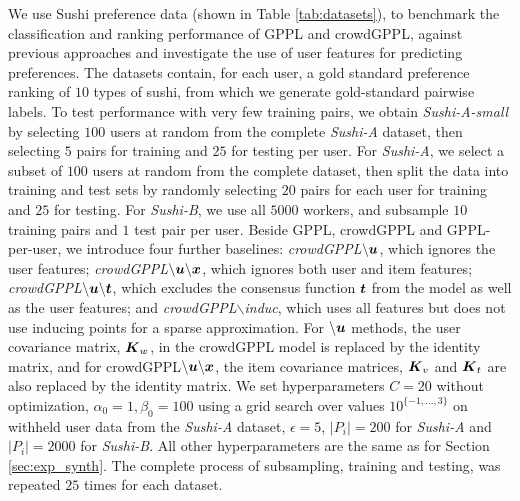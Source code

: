We use Sushi preference data (shown in Table \ref{tab:datasets}),
to benchmark the classification and ranking performance of GPPL and crowdGPPL, 
against previous approaches 
and investigate the use of user features for predicting preferences.
The datasets contain, for each user, a gold standard preference ranking 
of $10$ types of sushi,
from which we generate gold-standard pairwise labels. 
To test performance with very few training pairs, we obtain \emph{Sushi-A-small}
by selecting $100$ users at random from the complete \emph{Sushi-A} dataset,
then selecting $5$ pairs for training and $25$ for testing per user.
For \emph{Sushi-A}, we select a subset of $100$ users at random from the complete dataset, then 
split the data into training and test sets by randomly
selecting $20$ pairs for each user for training and $25$ for testing. 
For \emph{Sushi-B}, we use all $5000$ workers, and subsample $10$ training pairs and $1$ test pair per user.
Beside GPPL, crowdGPPL and GPPL-per-user, we 
introduce four further baselines: 
\emph{crowdGPPL$\mathbf{\backslash \boldsymbol u}$}, which ignores the user features;
 \emph{crowdGPPL$\mathbf{\backslash \boldsymbol u \backslash \boldsymbol x}$}, which ignores both user and item features;
 \emph{crowdGPPL$\mathbf{\backslash \boldsymbol u \backslash \boldsymbol t}$}, which 
excludes the consensus function $\boldsymbol t$ from the model as well as the user
features;
and  \emph{crowdGPPL$\backslash$induc}, which uses all features but does 
not use inducing points for a sparse approximation.
For $\backslash\boldsymbol u$ methods, the user covariance matrix, $\boldsymbol K_w$, in the crowdGPPL model is replaced by the identity matrix, and for crowdGPPL$\mathbf{\backslash \boldsymbol u \backslash \boldsymbol x}$, the item covariance matrices, $\boldsymbol K_v$ and $\boldsymbol K_t$ are also replaced by the identity matrix.
We set hyperparameters $C=20$ without optimization,
$\alpha_0=1, \beta_0=100$ using a grid search over values 
$10^{\{-1,...,3\}}$ on withheld user data from the \emph{Sushi-A} dataset,
$\epsilon=5$, $|P_i|=200$ for \emph{Sushi-A} and $|P_i|=2000$ for \emph{Sushi-B}. All other hyperparameters are the same 
as for Section \ref{sec:exp_synth}.
The complete process of subsampling, training and testing, was repeated $25$ times
for each dataset.

